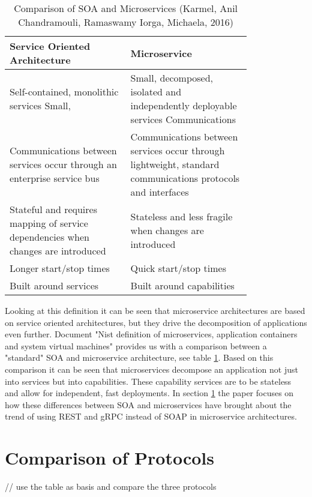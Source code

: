 \documentclass[conference]{IEEEtran}
\begin{document}
\begin{table}[!htbp]
	\centering
	\caption{Comparison of SOA and Microservices (Karmel, Anil
		Chandramouli, Ramaswamy
		Iorga, Michaela, 2016)}
	\label{micro:comparison}
	\begin{tabular}{| p{0.4\linewidth} | p{0.4\linewidth}|}\hline
		Service Oriented Architecture & Microservice \\\hline
	
	Self-contained, monolithic services Small, & Small, decomposed, isolated and independently deployable services Communications\\\hline
		Communications between services occur through an enterprise service bus & Communications between services occur through lightweight, standard communications protocols and interfaces\\\hline
		Stateful and requires mapping of service dependencies when changes are introduced & Stateless and less fragile when changes are introduced\\\hline
		Longer start/stop times & Quick start/stop times\\\hline
		Built around services & Built around capabilities\\\hline
	\end{tabular}
\end{table}

Looking at this definition it can be seen that microservice architectures are based on service oriented architectures, but they drive the decomposition of applications even further. Document "Nist definition of microservices, application containers and system virtual machines" \cite{karmel2016nist} provides us with a comparison between a "standard" SOA and microservice architecture, see table \ref{micro:comparison}. Based on this comparison it can be seen that microservices decompose an application not just into services but into capabilities. These capability services are to be stateless and allow for independent, fast deployments. In section \ref{sec:comp} the paper focuses on how these differences between SOA and microservices have brought about the trend of using REST and gRPC instead of SOAP in microservice architectures.

\section{Comparison of Protocols}
\label{sec:comp}

// use the table as basis and compare the three protocols


\end{document}
